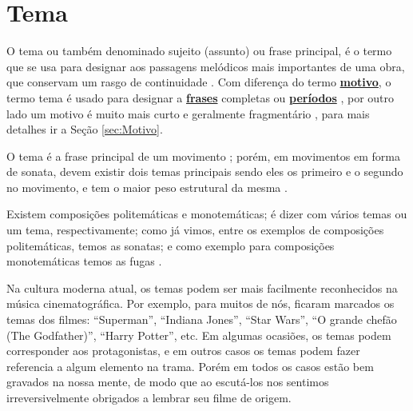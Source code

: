 \section{Tema}
\label{sec:tema}

O tema ou também denominado sujeito (assunto) ou frase principal,
é o termo que se usa para designar aos passagens melódicos mais importantes de uma obra, 
que conservam um rasgo de continuidade \cite[pp. 411]{stainer2009dictionary} \cite[pp. 1496]{latham2008diccionario}.
Com diferença do termo \hyperref[sec:Motivo]{\textbf{motivo}},
o termo tema é usado para designar a \hyperref[sec:Frase]{\textbf{frases}} completas 
ou \hyperref[sec:Periodo]{\textbf{períodos}} \cite[pp. 1496]{latham2008diccionario},
por outro lado um motivo é muito mais curto e geralmente fragmentário \cite[pp. 545]{apel1969harvard},
para mais detalhes ir a Seção \ref{sec:Motivo}.

O tema é a frase principal de um movimento \cite[pp. 411]{stainer2009dictionary};
porém,  em movimentos em forma de sonata, 
devem existir  dois  temas principais sendo eles os primeiro e o segundo no movimento, e
tem o maior peso estrutural da mesma \cite[pp. 411]{stainer2009dictionary} \cite[pp. 1496]{latham2008diccionario}.

Existem composições politemáticas e monotemáticas;
é dizer com vários temas ou um tema, respectivamente; 
como já vimos, entre os exemplos de composições politemáticas,
temos as sonatas; e como exemplo para composições monotemáticas temos as fugas \cite[pp. 539]{apel1969harvard}.

\begin{example}
Na cultura moderna atual, os temas podem ser mais facilmente reconhecidos  na música cinematográfica.
Por exemplo, para muitos de nós, ficaram marcados os temas dos filmes: ``Superman'', ``Indiana Jones'',
``Star Wars'', ``O grande chefão (The Godfather)'', ``Harry Potter'', etc.
Em algumas ocasiões, os temas podem corresponder aos protagonistas, 
e em outros casos os temas podem fazer referencia a algum elemento na trama.
Porém em todos os casos estão bem gravados na nossa mente, 
de modo que ao escutá-los nos sentimos irreversivelmente obrigados a lembrar seu filme de origem.
\end{example}

